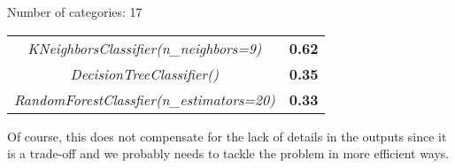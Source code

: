 \begin{table} [h!]

Number of categories: 17 \\

\begin{tabular}{c|c} 
    \textit{KNeighborsClassifier(n\_neighbors=9)} & \textbf{0.62} \\
    \textit{DecisionTreeClassifier()} & \textbf{0.35} \\
    \textit{RandomForestClassfier(n\_estimators=20)} & \textbf{0.33}
\end{tabular}

\end{table}

Of course, this does not compensate for the lack of details in the outputs since it is a trade-off and we probably needs to tackle the problem in more efficient ways.

